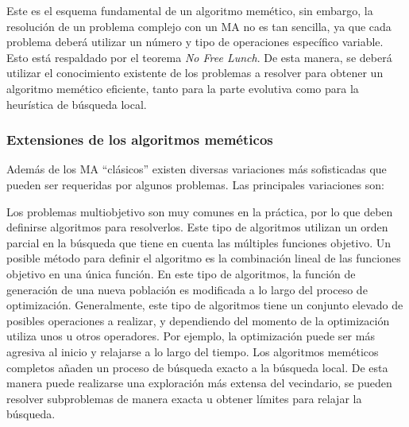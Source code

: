 Este es el esquema fundamental de un algoritmo memético, sin embargo, la resolución de un problema complejo con un MA no es tan sencilla, ya que cada problema deberá utilizar un número y tipo de operaciones específico variable. Esto está respaldado por el teorema \textit{No Free Lunch}. De esta manera, se deberá utilizar el conocimiento existente de los problemas a resolver para obtener un algoritmo memético eficiente, tanto para la parte evolutiva como para la heurística de búsqueda local. 

\subsubsection{Extensiones de los algoritmos meméticos}
Además de los MA ``clásicos'' existen diversas variaciones más sofisticadas que pueden ser requeridas por algunos problemas. Las principales variaciones son:
\begin{itemize}
     Los problemas multiobjetivo son muy comunes en la práctica, por lo que deben definirse algoritmos para resolverlos. Este tipo de algoritmos utilizan un orden parcial en la búsqueda que tiene en cuenta las múltiples funciones objetivo. Un posible método para definir el algoritmo es la combinación lineal de las funciones objetivo en una única función.
     En este tipo de algoritmos, la función de generación de una nueva población es modificada a lo largo del proceso de optimización. Generalmente, este tipo de algoritmos tiene un conjunto elevado de posibles operaciones a realizar, y dependiendo del momento de la optimización utiliza unos u otros operadores. Por ejemplo, la optimización puede ser más agresiva al inicio y relajarse a lo largo del tiempo.
     Los algoritmos meméticos completos añaden un proceso de búsqueda exacto a la búsqueda local. De esta manera puede realizarse una exploración más extensa del vecindario, se pueden resolver subproblemas de manera exacta u obtener límites para relajar la búsqueda.
\end{itemize}

